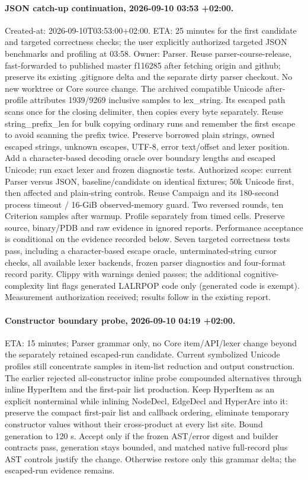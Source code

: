 \documentclass[11pt,a4paper]{article}
\begin{document}
\paragraph{JSON catch-up continuation, 2026-09-10 03:53 +02:00.}
Created-at: 2026-09-10T03:53:00+02:00. ETA: 25 minutes for the first candidate
and targeted correctness checks; the user explicitly authorized targeted JSON benchmarks and profiling at 03:58.
Owner: Parser. Reuse parser-course-release, fast-forwarded to published master
f116285 after fetching origin and github; preserve its existing .gitignore delta
and the separate dirty parser checkout. No new worktree or Core source change.
The archived compatible Unicode after-profile attributes 1939/9269 inclusive
samples to lex\_string. Its escaped path scans once for the closing delimiter,
then copies every byte separately. Reuse string\_prefix\_len for bulk copying
ordinary runs and remember the first escape to avoid scanning the prefix twice.
Preserve borrowed plain strings, owned escaped strings, unknown escapes, UTF-8,
error text/offset and lexer position. Add a character-based decoding oracle over
boundary lengths and escaped Unicode; run exact lexer and frozen diagnostic tests.
Authorized scope: current Parser versus JSON, baseline/candidate on identical
fixtures; 50k Unicode first, then affected and plain-string controls. Reuse
Campaign and its 180-second process timeout / 16-GiB observed-memory guard.
Two reversed rounds, ten Criterion samples after warmup. Profile separately
from timed cells. Preserve source, binary/PDB and raw evidence in ignored reports.
Performance acceptance is conditional on the evidence recorded below.
Seven targeted correctness tests pass, including a character-based escape oracle,
unterminated-string cursor checks, all available lexer backends, frozen parser
diagnostics and four-format record parity. Clippy with warnings denied passes;
the additional cognitive-complexity lint flags generated LALRPOP code only
(generated code is exempt). Measurement authorization received; results follow in the existing report.


\paragraph{Constructor boundary probe, 2026-09-10 04:19 +02:00.}
ETA: 15 minutes; Parser grammar only, no Core item/API/lexer change beyond the
separately retained escaped-run candidate. Current symbolized Unicode profiles
still concentrate samples in item-list reduction and output construction.
The earlier rejected all-constructor inline probe compounded alternatives through
inline HyperItem and the first-pair list production. Keep HyperItem as an explicit
nonterminal while inlining NodeDecl, EdgeDecl and HyperArc into it: preserve the
compact first-pair list and callback ordering, eliminate temporary constructor
values without their cross-product at every list site. Bound generation to 120 s.
Accept only if the frozen AST/error digest and builder contracts pass, generation
stays bounded, and matched native full-record plus AST controls justify the change.
Otherwise restore only this grammar delta; the escaped-run evidence remains.
\end{document}
